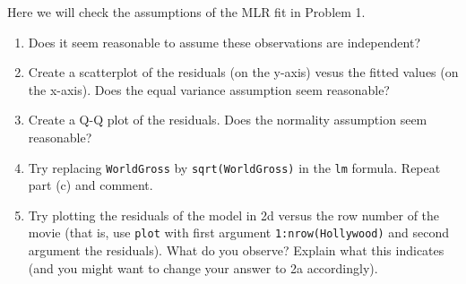 \documentclass[]{article}
\begin{document}
Here we will check the assumptions of the MLR fit in Problem 1.

\begin{enumerate}
\def\labelenumi{\alph{enumi})}
\item
  Does it seem reasonable to assume these observations are independent?
\item
  Create a scatterplot of the residuals (on the y-axis) vesus the fitted
  values (on the x-axis). Does the equal variance assumption seem
  reasonable?
\item
  Create a Q-Q plot of the residuals. Does the normality assumption seem
  reasonable?
\item
  Try replacing \texttt{WorldGross} by \texttt{sqrt(WorldGross)} in the
  \texttt{lm} formula. Repeat part (c) and comment.
\item
  Try plotting the residuals of the model in 2d versus the row number of
  the movie (that is, use \texttt{plot} with first argument
  \texttt{1:nrow(Hollywood)} and second argument the residuals). What do
  you observe? Explain what this indicates (and you might want to change
  your answer to 2a accordingly).
\end{enumerate}
\end{document}
